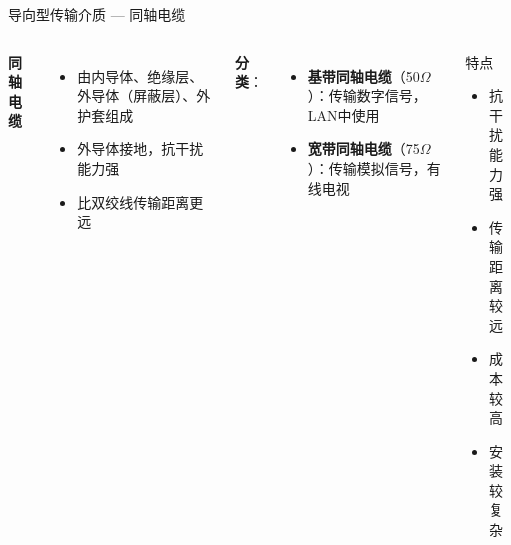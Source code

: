 \documentclass[10pt, aspectratio=169]{beamer}
\begin{document}
\begin{frame}{导向型传输介质 --- 同轴电缆}
    \begin{columns}[T]
        \textbf{同轴电缆}
        \begin{itemize}
            \item 由内导体、绝缘层、外导体（屏蔽层）、外护套组成
            \item 外导体接地，抗干扰能力强
            \item 比双绞线传输距离更远
        \end{itemize}
        \vspace{0.3em}
        \textbf{分类}：
        \begin{itemize}
            \item \textbf{基带同轴电缆}（50$\Omega$）：传输数字信号，LAN中使用
            \item \textbf{宽带同轴电缆}（75$\Omega$）：传输模拟信号，有线电视
        \end{itemize}
        \begin{block}{特点}
            \begin{itemize}
                \item[\color{green!70!black}$\checkmark$] 抗干扰能力强
                \item[\color{green!70!black}$\checkmark$] 传输距离较远
                \item[\color{red!70!black}$\times$] 成本较高
                \item[\color{red!70!black}$\times$] 安装较复杂
            \end{itemize}
        \end{block}
    \end{columns}
\end{frame}
\end{document}
